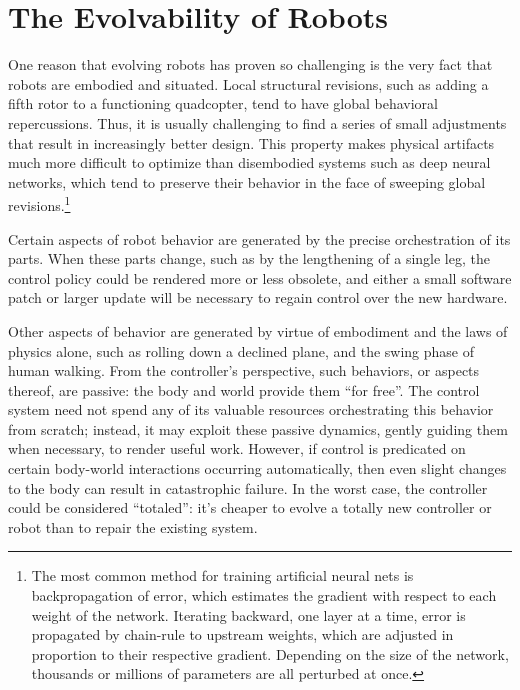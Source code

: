 


\section{The Evolvability of Robots}


One reason that evolving robots 
has proven so challenging is the very fact that robots are embodied and situated.
Local structural revisions, such as adding a fifth rotor to a functioning quadcopter, tend to have global behavioral repercussions.
Thus, it is usually challenging to find a series of small adjustments that result in increasingly better design. 
This property makes physical artifacts much more difficult to optimize than disembodied systems such as deep neural networks, which tend to preserve their behavior in the face of sweeping global revisions.\footnote{%
The most common method for training artificial neural nets is backpropagation of error, which
estimates the gradient with respect to each weight of the network.
Iterating backward, one layer at a time, error is propagated by chain-rule to upstream weights, which are adjusted in proportion to their respective gradient.
Depending on the size of the network, thousands or millions of parameters are all perturbed at once.%
}

Certain aspects of robot behavior are generated by the precise orchestration of its parts.
When these parts change, such as by the lengthening of a single leg, the control policy could be rendered more or less obsolete, and either a small software patch or larger update will be necessary to regain control over the new hardware.

Other aspects of behavior are generated by virtue of embodiment and the laws of physics alone, such as rolling down a declined plane, and the swing phase of human walking.
From the controller's perspective, such behaviors, or aspects thereof, are passive: the body and world provide them ``for free''.
The control system need not spend any of its valuable resources orchestrating this behavior from scratch; instead, it may exploit these passive dynamics, gently guiding them when necessary, to render useful work.
However, if control is predicated on certain body-world interactions occurring automatically, then even slight changes to the body can result in catastrophic failure.
In the worst case, the controller could be considered ``totaled'': it's cheaper to evolve a totally new controller or robot than to repair the existing system.

